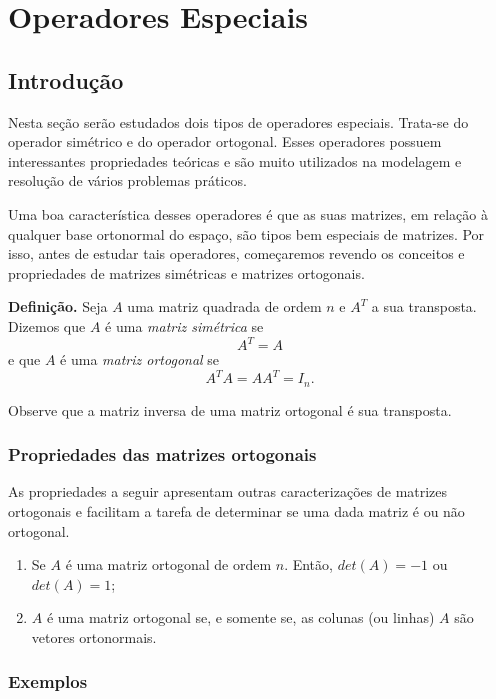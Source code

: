 \chapter{Operadores Especiais}
\thispagestyle{empty}

\section{Introdução}

Nesta seção serão estudados dois tipos de operadores especiais.  Trata-se do operador simétrico e do operador  ortogonal. Esses operadores possuem interessantes propriedades teóricas e são muito utilizados na modelagem e resolução de vários  problemas práticos.

Uma boa característica desses operadores é que as suas matrizes,  em relação à qualquer base ortonormal do espaço, são tipos bem especiais de matrizes. Por isso, antes de estudar tais operadores, começaremos revendo os conceitos e propriedades de matrizes simétricas e  matrizes ortogonais.

\textbf{Definição.} Seja $A$ uma matriz quadrada de ordem $n$ e $A^T$ a sua transposta. Dizemos que $A$ é uma \textit{matriz simétrica} se $$A^T=A$$ e que $A$ é uma \textit{matriz ortogonal} se $$A^TA=AA^T=I_n.$$

Observe que a matriz  inversa de uma matriz ortogonal é sua transposta.

 \subsection{Propriedades das matrizes ortogonais}

As propriedades a seguir apresentam  outras caracterizações de matrizes ortogonais e facilitam a tarefa de determinar se uma dada matriz é ou não ortogonal.

\begin{enumerate}
\item Se $A$ é uma matriz ortogonal de ordem $n$. Então,  $det(A)=-1$ ou $det(A)=1$;
\item $A$ é uma matriz ortogonal  se, e somente se, as colunas (ou linhas) $A$ são vetores ortonormais.
\end{enumerate}

\subsection{Exemplos}

